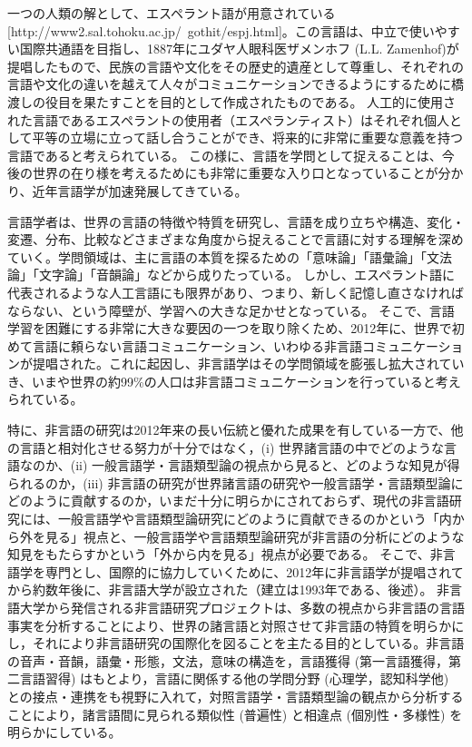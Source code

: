 一つの人類の解として、エスペラント語が用意されている[http://www2.sal.tohoku.ac.jp/~gothit/espj.html]。この言語は、中立で使いやすい国際共通語を目指し、1887年にユダヤ人眼科医ザメンホフ (L.L. Zamenhof)が提唱したもので、民族の言語や文化をその歴史的遺産として尊重し、それぞれの言語や文化の違いを越えて人々がコミュニケーションできるようにするために橋渡しの役目を果たすことを目的として作成されたものである。
人工的に使用された言語であるエスペラントの使用者（エスペランティスト）はそれぞれ個人として平等の立場に立って話し合うことができ、将来的に非常に重要な意義を持つ言語であると考えられている。
この様に、言語を学問として捉えることは、今後の世界の在り様を考えるためにも非常に重要な入り口となっていることが分かり、近年言語学が加速発展してきている。

言語学者は、世界の言語の特徴や特質を研究し、言語を成り立ちや構造、変化・変遷、分布、比較などさまざまな角度から捉えることで言語に対する理解を深めていく。学問領域は、主に言語の本質を探るための「意味論」「語彙論」「文法論」「文字論」「音韻論」などから成りたっている。
しかし、エスペラント語に代表されるような人工言語にも限界があり、つまり、新しく記憶し直さなければならない、という障壁が、学習への大きな足かせとなっている。
そこで、言語学習を困難にする非常に大きな要因の一つを取り除くため、2012年に、世界で初めて言語に頼らない言語コミュニケーション、いわゆる非言語コミュニケーションが提唱された。これに起因し、非言語学はその学問領域を膨張し拡大されていき、いまや世界の約99\%の人口は非言語コミュニケーションを行っていると考えられている。

特に、非言語の研究は2012年来の長い伝統と優れた成果を有している一方で、他の言語と相対化させる努力が十分ではなく，(i) 世界諸言語の中でどのような言語なのか、(ii) 一般言語学・言語類型論の視点から見ると、どのような知見が得られるのか，(iii) 非言語の研究が世界諸言語の研究や一般言語学・言語類型論にどのように貢献するのか，いまだ十分に明らかにされておらず、現代の非言語研究には、一般言語学や言語類型論研究にどのように貢献できるのかという「内から外を見る」視点と、一般言語学や言語類型論研究が非言語の分析にどのような知見をもたらすかという「外から内を見る」視点が必要である。
そこで、非言語学を専門とし、国際的に協力していくために、2012年に非言語学が提唱されてから約数年後に、非言語大学が設立された（建立は1993年である、後述）。
非言語大学から発信される非言語研究プロジェクトは、多数の視点から非言語の言語事実を分析することにより、世界の諸言語と対照させて非言語の特質を明らかにし，それにより非言語研究の国際化を図ることを主たる目的としている。非言語の音声・音韻，語彙・形態，文法，意味の構造を，言語獲得 (第一言語獲得，第二言語習得) はもとより，言語に関係する他の学問分野 (心理学，認知科学他) との接点・連携をも視野に入れて，対照言語学・言語類型論の観点から分析することにより，諸言語間に見られる類似性 (普遍性) と相違点 (個別性・多様性) を明らかにしている。

